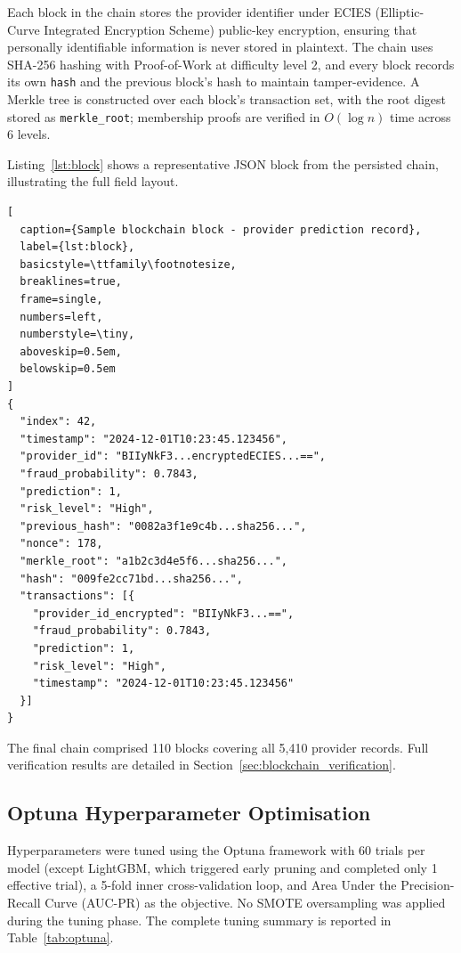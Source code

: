 Each block in the chain stores the provider identifier under ECIES
(Elliptic-Curve Integrated Encryption Scheme) public-key encryption,
ensuring that personally identifiable information is never stored in
plaintext. The chain uses SHA-256 hashing with Proof-of-Work at
difficulty level 2, and every block records its own \texttt{hash} and
the previous block's hash to maintain tamper-evidence. A Merkle tree is
constructed over each block's transaction set, with the root digest
stored as \texttt{merkle\_root}; membership proofs are verified in
$O(\log n)$ time across 6 levels.

Listing~\ref{lst:block} shows a representative JSON block from the
persisted chain, illustrating the full field layout.

\vspace{0.5em}
\noindent
\begin{minipage}{\linewidth}
\begin{lstlisting}[
  caption={Sample blockchain block - provider prediction record},
  label={lst:block},
  basicstyle=\ttfamily\footnotesize,
  breaklines=true,
  frame=single,
  numbers=left,
  numberstyle=\tiny,
  aboveskip=0.5em,
  belowskip=0.5em
]
{
  "index": 42,
  "timestamp": "2024-12-01T10:23:45.123456",
  "provider_id": "BIIyNkF3...encryptedECIES...==",
  "fraud_probability": 0.7843,
  "prediction": 1,
  "risk_level": "High",
  "previous_hash": "0082a3f1e9c4b...sha256...",
  "nonce": 178,
  "merkle_root": "a1b2c3d4e5f6...sha256...",
  "hash": "009fe2cc71bd...sha256...",
  "transactions": [{
    "provider_id_encrypted": "BIIyNkF3...==",
    "fraud_probability": 0.7843,
    "prediction": 1,
    "risk_level": "High",
    "timestamp": "2024-12-01T10:23:45.123456"
  }]
}
\end{lstlisting}
\end{minipage}

The final chain comprised 110 blocks covering all 5{,}410 provider
records. Full verification results are detailed in
Section~\ref{sec:blockchain_verification}.

\subsection{Optuna Hyperparameter Optimisation}

Hyperparameters were tuned using the Optuna framework with 60 trials per
model (except LightGBM, which triggered early pruning and completed only
1 effective trial), a 5-fold inner cross-validation loop, and
Area Under the Precision-Recall Curve (AUC-PR) as the objective. No
SMOTE oversampling was applied during the tuning phase. The complete
tuning summary is reported in Table~\ref{tab:optuna}.

